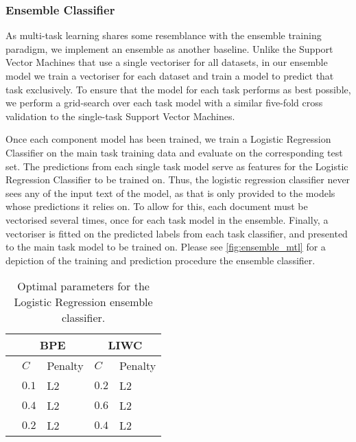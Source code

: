 \subsubsection{Ensemble Classifier}

As multi-task learning shares some resemblance with the ensemble training paradigm, we implement an ensemble as another baseline. Unlike the Support Vector Machines that use a single vectoriser for all datasets, in our ensemble model we train a vectoriser for each dataset and train a model to predict that task exclusively. To ensure that the model for each task performs as best possible, we perform a grid-search over each task model with a similar five-fold cross validation to the single-task Support Vector Machines.
\begin{figure}
  \centering
  \label{fig:ensemble_mtl}
\end{figure}

Once each component model has been trained, we train a Logistic Regression Classifier on the main task training data and evaluate on the corresponding test set. The predictions from each single task model serve as features for the Logistic Regression Classifier to be trained on. Thus, the logistic regression classifier never sees any of the input text of the model, as that is only provided to the models whose predictions it relies on. To allow for this, each document must be vectorised several times, once for each task model in the ensemble. Finally, a vectoriser is fitted on the predicted labels from each task classifier, and presented to the main task model to be trained on. Please see \autoref{fig:ensemble_mtl} for a depiction of the training and prediction procedure the ensemble classifier.

\begin{table}[]
\centering
\begin{tabular}{l|ll|ll}
                     & \multicolumn{2}{c}{BPE} & \multicolumn{2}{c}{LIWC} \\ \hline
                     & $C$     & Penalty       & $C$      & Penalty       \\ \hline
\cite{Waseem:2016}   & $0.1$   & L2            & $0.2$    & L2             \\
\cite{Davidson:2017} & $0.4$   & L2            & $0.6$    & L2             \\
\cite{Wulczyn:2016}  & $0.2$   & L2            & $0.4$    & L2
\end{tabular}
\caption{Optimal parameters for the Logistic Regression ensemble classifier.}
\label{tab:mtl_ensemble_parameters}
\end{table}

